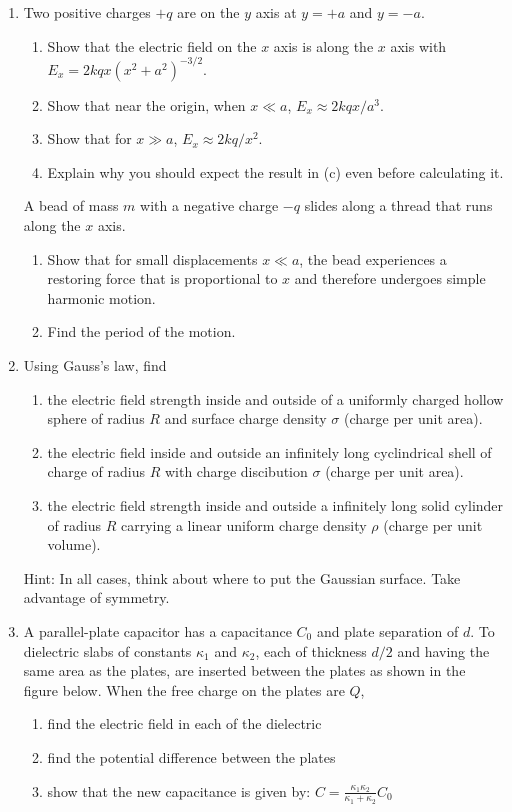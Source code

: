 \documentclass{../../oss-apphys}
\begin{document}
\begin{enumerate}[leftmargin=15pt]
\item Two positive charges $+q$ are on the $y$ axis at $y=+a$ and $y=-a$.
  \begin{enumerate}[leftmargin=15pt]
  \item Show that the electric field on the $x$ axis is along the $x$ axis with
    $E_x=2kqx(x^2+a^2)^{-3/2}$.
  \item Show that near the origin, when $x\ll a$, $E_x\approx 2kqx/a^3$.
  \item Show that for $x\gg a$, $E_x\approx 2kq/x^2$.
  \item Explain why you should expect the result in (c) even before calculating
    it.
  \end{enumerate}
  A bead of mass $m$ with a negative charge $-q$ slides along a thread that
  runs along the $x$ axis.
  \begin{enumerate}[start=5,leftmargin=15pt]
  \item Show that for small displacements $x\ll a$, the bead experiences a
    restoring force that is proportional to $x$ and therefore undergoes
    simple harmonic motion.
  \item Find the period of the motion.
  \end{enumerate}
  \newpage

\item Using Gauss's law, find
  \begin{enumerate}[leftmargin=15pt]
  \item the electric field strength inside and outside of a uniformly charged
    hollow sphere of radius $R$ and surface charge density $\sigma$ (charge
    per unit area).

  \item the electric field inside and outside an infinitely long cyclindrical
    shell of charge of radius $R$ with charge discibution $\sigma$ (charge
    per unit area).
  \item the electric field strength inside and outside a infinitely long solid
    cylinder of radius $R$ carrying a linear uniform charge density $\rho$
    (charge per unit volume).
  \end{enumerate}
  Hint: In all cases, think about where to put the Gaussian surface. Take
  advantage of symmetry.
  \newpage

\item A parallel-plate capacitor has a capacitance $C_0$ and plate separation
  of $d$. To dielectric slabs of constants $\kappa_1$ and $\kappa_2$, each of
  thickness $d/2$ and having the same area as the plates, are inserted between
  the plates as shown in the figure below. When the free charge on the plates
  are $Q$,
  \begin{enumerate}[noitemsep]
  \item find the electric field in each of the dielectric
  \item find the potential difference between the plates
  \item show that the new capacitance is given by:
    $\displaystyle C=\frac{\kappa_1\kappa_2}{\kappa_1+\kappa_2}C_0$
  \end{enumerate}
  \vspace{1.5in}


\end{enumerate}
\end{document}
